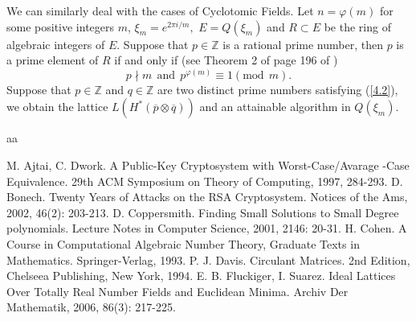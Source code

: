 \documentclass [11pt]{article}
\begin{document}
We can similarly deal with the cases of Cyclotomic Fields. Let $n=\varphi(m)$ for some positive integers $m$, $\xi_{m}=e^{2\pi i /m},$
$E=Q(\xi_{m})$  and $R \subset E$ be the ring of algebraic integers of $E.$ Suppose that $p\in \mathbb{Z}$  is a rational prime number, then $p$ is a prime element of $R$ if and only if (see Theorem 2 of page 196 of \cite{I})
\begin{equation}\label{4.2}
p \nmid m \ \ \text{and}\ \ p^{\varphi(m)} \equiv 1(\text{mod}\ \ m).
\end{equation}
Suppose that $p \in \mathbb{Z}$ and $q\in \mathbb{Z}$ are two distinct prime numbers satisfying (\ref{4.2}), we obtain  the lattice $L(H^{*}(\overline{p} \otimes \overline{q} ))$ and an attainable algorithm in $Q(\xi_{m}). $
 \vspace{-0.4cm}{\footnotesize}
\begin{thebibliography}{aa}

  M. Ajtai, C. Dwork. A Public-Key Cryptosystem with Worst-Case/Avarage -Case Equivalence. 29th ACM Symposium on Theory of Computing, 1997, 284-293.
 D. Bonech. Twenty Years of Attacks on the RSA Cryptosystem. Notices of the Ams,  2002,  46(2): 203-213.
 D. Coppersmith.  Finding  Small  Solutions  to  Small Degree polynomials.  Lecture Notes in Computer Science, 2001, 2146: 20-31.
 H. Cohen. A Course in Computational Algebraic Number Theory,  Graduate Texts in Mathematics.  Springer-Verlag, 1993.
 P. J. Davis. Circulant Matrices. 2nd Edition, Chelseea Publishing, New York, 1994.
  E. B. Fluckiger, I. Suarez.  Ideal Lattices Over Totally Real Number Fields and Euclidean Minima. Archiv Der Mathematik, 2006, 86(3): 217-225.


\end{thebibliography}
\end{document}
